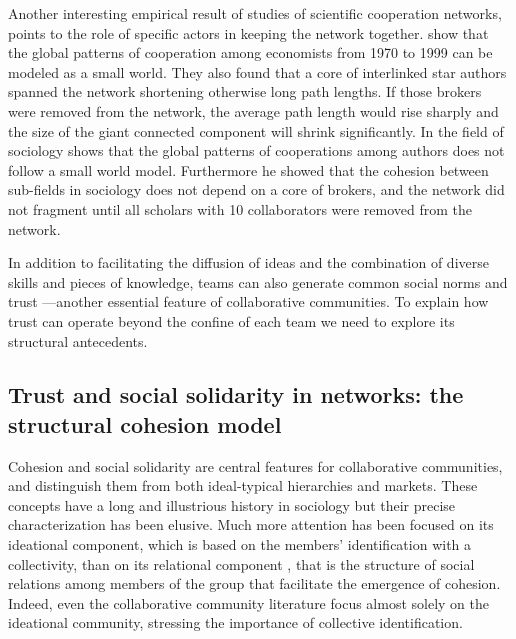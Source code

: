 Another interesting empirical result of studies of scientific cooperation networks, points to the role of specific actors in keeping the network together. \citet*{goyal:2006} show that the global patterns of cooperation among economists from 1970 to 1999 can be modeled as a small world. They also found that a core of interlinked star authors spanned the network shortening otherwise long path lengths. If those brokers were removed from the network, the average path length would rise sharply and the size of the giant connected component will shrink significantly. In the field of sociology \citet{moody:2004} shows that the global patterns of cooperations among authors does not follow a small world model. Furthermore he showed that the cohesion between sub-fields in sociology does not depend on a core of brokers, and the network did not fragment until all scholars with 10 collaborators were removed from the network.

In addition to facilitating the diffusion of ideas and the combination of diverse skills and pieces of knowledge, teams can also generate common social norms and trust ---another essential feature of collaborative communities.  To explain how trust can operate beyond the confine of each team we need to explore its structural antecedents.

\subsection{Trust and social solidarity in networks: the structural cohesion model}
\label{scm}

Cohesion and social solidarity are central features for collaborative communities, and distinguish them from both ideal-typical hierarchies and markets. These concepts have a long and illustrious history in sociology \citep{durkheim:2008} but their precise characterization has been elusive. Much more attention has been focused on its ideational component, which is based on the members' identification with a collectivity, than on its relational component \citep{doreian:1998}, that is the structure of social relations among members of the group that facilitate the emergence of cohesion. Indeed, even the collaborative community literature focus almost solely on the ideational community, stressing the importance of collective identification.

